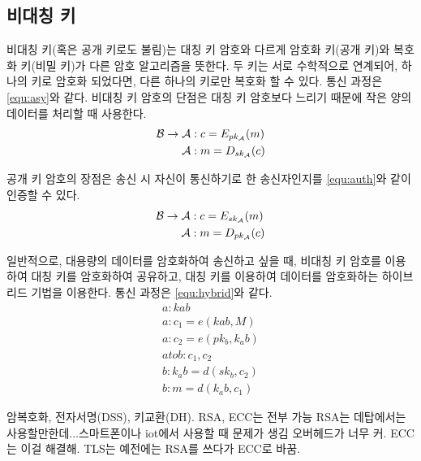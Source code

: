\subsection*{비대칭 키}

비대칭 키(혹은 공개 키로도 불림)는 대칭 키 암호와 다르게 암호화 키(공개 키)와
복호화 키(비밀 키)가 다른 암호 알고리즘을 뜻한다. 두 키는 서로 수학적으로
연계되어, 하나의 키로 암호화 되었다면, 다른 하나의 키로만 복호화 할 수 있다.
통신 과정은 \ref{equ:asy}와 같다. 비대칭 키 암호의 단점은 대칭 키 암호보다
느리기 때문에 작은 양의 데이터를 처리할 때 사용한다.
\begin{equation}
  \begin{split}
    \mathcal{B} \to \mathcal{A}&: c = E_{pk_{\mathcal{A}}}(m) \\
    \mathcal{A}&: m = D_{sk_{\mathcal{A}}}(c)
  \end{split}
  \label{equ:asy}
\end{equation}

공개 키 암호의 장점은 송신 시 자신이 통신하기로 한 송신자인지를 \ref{equ:auth}와 같이 인증할 수 있다.
\begin{equation}
  \begin{split}
    \mathcal{B} \to \mathcal{A}&: c = E_{sk_{\mathcal{A}}}(m) \\
    \mathcal{A}&: m = D_{pk_{\mathcal{A}}}(c)
  \end{split}
  \label{equ:auth}
\end{equation}

일반적으로, 대용량의 데이터를 암호화하여 송신하고 싶을 때, 비대칭 키 암호를
이용하여 대칭 키를 암호화하여 공유하고, 대칭 키를 이용하여 데이터를 암호화하는
하이브리드 기법을 이용한다. 통신 과정은 \ref{equ:hybrid}와 같다.
\begin{equation}
  \begin{split}
    a : kab \\
    a : c_1 = e(kab, M) \\
    a : c_2 = e(pk_b, k_ab) \\
    a to b : c_1, c_2 \\
    b : k_ab = d(sk_b, c_2) \\
    b : m = d(k_ab, c_1)
  \end{split}
  \label{equ:hybrid}
\end{equation}

암복호화, 전자서명(DSS), 키교환(DH). RSA, ECC는 전부 가능
RSA는 데탑에서는 사용할만한데...스마트폰이나 iot에서 사용할 때 문제가 생김
오버헤드가 너무 커. ECC는 이걸 해결해. TLS는 예전에는 RSA를 쓰다가 ECC로 바꿈.

